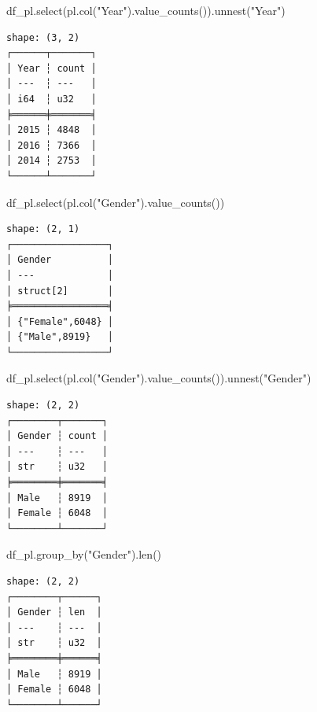 \documentclass[
  letterpaper,
  DIV=11,
  numbers=noendperiod]{scrreprt}
\newenvironment{Shaded}{\begin{snugshade}}{\end{snugshade}}
\newcommand{\BuiltInTok}[1]{\textcolor[rgb]{0.00,0.23,0.31}{#1}}
\newcommand{\NormalTok}[1]{\textcolor[rgb]{0.00,0.23,0.31}{#1}}
\newcommand{\StringTok}[1]{\textcolor[rgb]{0.13,0.47,0.30}{#1}}
\begin{document}
\begin{Shaded}
\begin{Highlighting}[]
\NormalTok{df\_pl.select(pl.col(}\StringTok{"Year"}\NormalTok{).value\_counts()).unnest(}\StringTok{"Year"}\NormalTok{)}
\end{Highlighting}
\end{Shaded}

\begin{verbatim}
shape: (3, 2)
┌──────┬───────┐
│ Year ┆ count │
│ ---  ┆ ---   │
│ i64  ┆ u32   │
╞══════╪═══════╡
│ 2015 ┆ 4848  │
│ 2016 ┆ 7366  │
│ 2014 ┆ 2753  │
└──────┴───────┘
\end{verbatim}

\begin{Shaded}
\begin{Highlighting}[]
\NormalTok{df\_pl.select(pl.col(}\StringTok{"Gender"}\NormalTok{).value\_counts())}
\end{Highlighting}
\end{Shaded}

\begin{verbatim}
shape: (2, 1)
┌─────────────────┐
│ Gender          │
│ ---             │
│ struct[2]       │
╞═════════════════╡
│ {"Female",6048} │
│ {"Male",8919}   │
└─────────────────┘
\end{verbatim}

\begin{Shaded}
\begin{Highlighting}[]
\NormalTok{df\_pl.select(pl.col(}\StringTok{"Gender"}\NormalTok{).value\_counts()).unnest(}\StringTok{"Gender"}\NormalTok{)}
\end{Highlighting}
\end{Shaded}

\begin{verbatim}
shape: (2, 2)
┌────────┬───────┐
│ Gender ┆ count │
│ ---    ┆ ---   │
│ str    ┆ u32   │
╞════════╪═══════╡
│ Male   ┆ 8919  │
│ Female ┆ 6048  │
└────────┴───────┘
\end{verbatim}

\begin{Shaded}
\begin{Highlighting}[]
\NormalTok{df\_pl.group\_by(}\StringTok{"Gender"}\NormalTok{).}\BuiltInTok{len}\NormalTok{()}
\end{Highlighting}
\end{Shaded}

\begin{verbatim}
shape: (2, 2)
┌────────┬──────┐
│ Gender ┆ len  │
│ ---    ┆ ---  │
│ str    ┆ u32  │
╞════════╪══════╡
│ Male   ┆ 8919 │
│ Female ┆ 6048 │
└────────┴──────┘
\end{verbatim}
\end{document}
